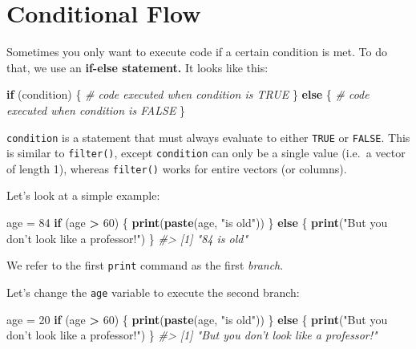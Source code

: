 \documentclass[]{book}
\newenvironment{Shaded}{\begin{snugshade}}{\end{snugshade}}
\newcommand{\KeywordTok}[1]{\textcolor[rgb]{0.13,0.29,0.53}{\textbf{#1}}}
\newcommand{\DecValTok}[1]{\textcolor[rgb]{0.00,0.00,0.81}{#1}}
\newcommand{\StringTok}[1]{\textcolor[rgb]{0.31,0.60,0.02}{#1}}
\newcommand{\CommentTok}[1]{\textcolor[rgb]{0.56,0.35,0.01}{\textit{#1}}}
\newcommand{\ControlFlowTok}[1]{\textcolor[rgb]{0.13,0.29,0.53}{\textbf{#1}}}
\newcommand{\OperatorTok}[1]{\textcolor[rgb]{0.81,0.36,0.00}{\textbf{#1}}}
\newcommand{\NormalTok}[1]{#1}
\begin{document}
\hypertarget{conditional-flow}{\section{Conditional
Flow}\label{conditional-flow}}

Sometimes you only want to execute code if a certain condition is met.
To do that, we use an \textbf{if-else statement.} It looks like this:

\begin{Shaded}
\begin{Highlighting}[]
\ControlFlowTok{if}\NormalTok{ (condition) \{}
  \CommentTok{# code executed when condition is TRUE}
\NormalTok{\} }\ControlFlowTok{else}\NormalTok{ \{}
  \CommentTok{# code executed when condition is FALSE}
\NormalTok{\}}
\end{Highlighting}
\end{Shaded}

\texttt{condition} is a statement that must always evaluate to either
\texttt{TRUE} or \texttt{FALSE}. This is similar to \texttt{filter()},
except \texttt{condition} can only be a single value (i.e.~a vector of
length 1), whereas \texttt{filter()} works for entire vectors (or
columns).

Let's look at a simple example:

\begin{Shaded}
\begin{Highlighting}[]
\NormalTok{age =}\StringTok{ }\DecValTok{84}
\ControlFlowTok{if}\NormalTok{ (age }\OperatorTok{>}\StringTok{ }\DecValTok{60}\NormalTok{) \{}
    \KeywordTok{print}\NormalTok{(}\KeywordTok{paste}\NormalTok{(age, }\StringTok{"is old"}\NormalTok{))}
\NormalTok{\} }\ControlFlowTok{else}\NormalTok{ \{}
    \KeywordTok{print}\NormalTok{(}\StringTok{"But you don't look like a professor!"}\NormalTok{)}
\NormalTok{\}}
\CommentTok{#> [1] "84 is old"}
\end{Highlighting}
\end{Shaded}

We refer to the first \texttt{print} command as the first \emph{branch}.

Let's change the \texttt{age} variable to execute the second branch:

\begin{Shaded}
\begin{Highlighting}[]
\NormalTok{age =}\StringTok{ }\DecValTok{20}
\ControlFlowTok{if}\NormalTok{ (age }\OperatorTok{>}\StringTok{ }\DecValTok{60}\NormalTok{) \{}
    \KeywordTok{print}\NormalTok{(}\KeywordTok{paste}\NormalTok{(age, }\StringTok{"is old"}\NormalTok{))}
\NormalTok{\} }\ControlFlowTok{else}\NormalTok{ \{}
    \KeywordTok{print}\NormalTok{(}\StringTok{"But you don't look like a professor!"}\NormalTok{)}
\NormalTok{\}}
\CommentTok{#> [1] "But you don't look like a professor!"}
\end{Highlighting}
\end{Shaded}
\end{document}
